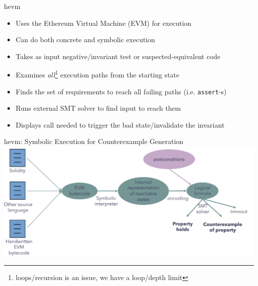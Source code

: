 \documentclass[aspectratio=169]{beamer}
\begin{document}
\begin{frame}{hevm}
\begin{itemize}
\item Uses the Ethereum Virtual Machine (EVM) for execution
\item Can do both concrete and symbolic execution
\item Takes as input negative/invariant test or suspected-equivalent code
\item Examines \emph{all}\footnote{loops/recursion is an issue, we have a loop/depth limit} execution paths from the starting state
\item Finds the set of requirements to reach all failing paths (i.e. \texttt{assert}-s)
\item Runs external SMT solver to find input to reach them
\item Displays call needed to trigger the bad state/invalidate the invariant
\end{itemize}
\end{frame}



%
%
%

\begin{frame}{hevm: Symbolic Execution for Counterexample Generation}
\centering
\includegraphics[scale=0.45]{pipeline}
\end{frame}
\end{document}
